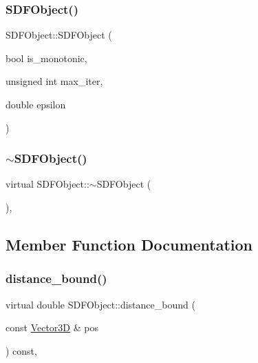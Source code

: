 \mbox{\label{classSDFObject_a908bc77db501ad2b4e04dcecc389cfee}} 
\subsubsection{\texorpdfstring{SDFObject()}{SDFObject()}\hspace{0.1cm}{\footnotesize\ttfamily [3/3]}}
{\footnotesize\ttfamily S\+D\+F\+Object\+::\+S\+D\+F\+Object (\begin{DoxyParamCaption}\item[{bool}]{is\+\_\+monotonic,  }\item[{unsigned int}]{max\+\_\+iter,  }\item[{double}]{epsilon }\end{DoxyParamCaption})\hspace{0.3cm}{\ttfamily [inline]}}

\mbox{\label{classSDFObject_a3ceca3fd0d007ecb4b39993d30afa623}} 
\subsubsection{\texorpdfstring{$\sim$SDFObject()}{~SDFObject()}}
{\footnotesize\ttfamily virtual S\+D\+F\+Object\+::$\sim$\+S\+D\+F\+Object (\begin{DoxyParamCaption}{ }\end{DoxyParamCaption})\hspace{0.3cm}{\ttfamily [virtual]}, {\ttfamily [default]}}



\subsection{Member Function Documentation}
\mbox{\label{classSDFObject_ac34f5232b6ea395178d33e3b084d5a93}} 
\subsubsection{\texorpdfstring{distance\_bound()}{distance\_bound()}}
{\footnotesize\ttfamily virtual double S\+D\+F\+Object\+::distance\+\_\+bound (\begin{DoxyParamCaption}\item[{const \mbox{\hyperlink{classVector3D}{Vector3D}} \&}]{pos }\end{DoxyParamCaption}) const\hspace{0.3cm}{\ttfamily [private]}, {}}



